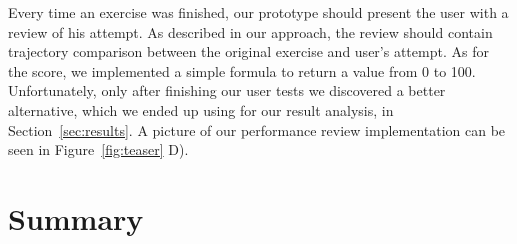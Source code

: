 Every time an exercise was finished, our prototype should present the user with a review of his attempt. 
As described in our approach, the review should contain trajectory comparison between the original exercise and user's attempt.
As for the score, we implemented a simple formula to return a value from 0 to 100.
Unfortunately, only after finishing our user tests we discovered a better alternative, which we ended up using for our result analysis, in Section~\ref{sec:results}.
A picture of our performance review implementation can be seen in Figure~\ref{fig:teaser} D). 



\section{Summary}
